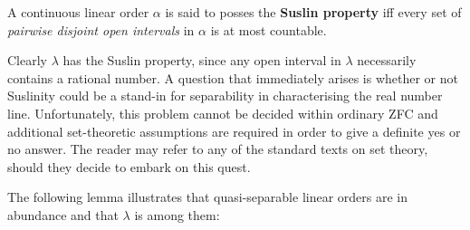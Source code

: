 \begin{dfn}
	A continuous linear order $\alpha$ is said to posses the \textbf{Suslin
		property} iff every set of \textit{pairwise disjoint open intervals} in
	$\alpha$ is at most countable.
\end{dfn}

Clearly $\lambda$ has the Suslin property, since any open interval in $\lambda$
necessarily contains a rational number.  A question that immediately arises is
whether or not Suslinity could be a stand-in for separability in characterising
the real number line.  Unfortunately, this problem cannot be decided within
ordinary ZFC and additional set-theoretic assumptions are required in order to
give a definite yes or no answer.  The reader may refer to any of the standard
texts on set theory, should they decide to embark on this quest.

The following lemma illustrates that quasi-separable linear orders are in
abundance and that $\lambda$ is among them:

